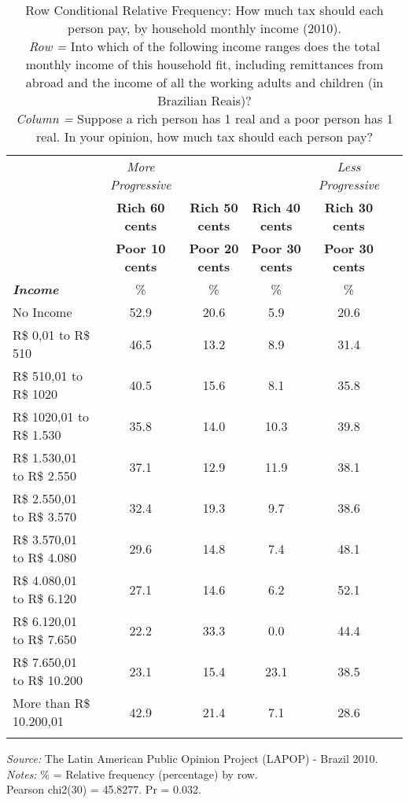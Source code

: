\documentclass[12pt,a4paper]{article}
\begin{document}
\begin{table}
\centering
\footnotesize
\caption[caption]{Row Conditional Relative Frequency: How much tax should each person pay, by household monthly income (2010). \\\hspace{\textwidth} \textit{Row =} Into which of the following income ranges does the total monthly income of this household fit, including remittances from abroad and the income of all the working adults and children (in Brazilian Reais)? \\\hspace{\textwidth} \textit{Column =} Suppose a rich person has 1 real and a poor person has 1 real. In your opinion, how much tax should each person pay?}
\begin{tabular}{l *{5}{c} }\\
\toprule

&\textit{More Progressive}&&&\textit{Less Progressive} \\

&\textbf{Rich 60 cents}&\textbf{Rich 50 cents}&\textbf{Rich 40 cents}&\textbf{Rich 30 cents} \\

&\textbf{Poor 10 cents}&\textbf{Poor 20 cents}&\textbf{Poor 30 cents}&\textbf{Poor 30 cents} \\

\cmidrule(l{.75em}){2-2} \cmidrule(l{.75em}){3-3}\cmidrule(l{.75em}){4-4}\cmidrule(l{.75em}){5-5}
\textbf{\textit{Income}}&\%&\%&\%&\% \\

\midrule
No Income&52.9&20.6&5.9&20.6 \\
R\$ 0,01 to R\$ 510 &46.5&13.2&8.9&31.4 \\
R\$ 510,01 to R\$ 1020 &40.5&15.6&8.1&35.8 \\
R\$ 1020,01 to R\$ 1.530 &35.8&14.0&10.3&39.8 \\
R\$ 1.530,01 to R\$ 2.550 &37.1&12.9&11.9&38.1 \\
R\$ 2.550,01 to R\$ 3.570 &32.4&19.3&9.7&38.6 \\
R\$ 3.570,01 to R\$ 4.080 &29.6&14.8&7.4&48.1 \\
R\$ 4.080,01 to R\$ 6.120 &27.1&14.6&6.2&52.1 \\
R\$ 6.120,01 to R\$ 7.650 &22.2&33.3&0.0&44.4 \\
R\$ 7.650,01 to R\$ 10.200 &23.1&15.4&23.1&38.5 \\
More than R\$ 10.200,01&42.9&21.4&7.1&28.6 \\
\bottomrule
\addlinespace[.75ex]
\end{tabular}
\par
\scriptsize{\emph{Source: }The Latin American Public Opinion Project (LAPOP) - Brazil 2010.}\\
\scriptsize{\emph{Notes:} \% = Relative frequency (percentage) by row.}\\
\scriptsize{Pearson chi2(30) =  45.8277. Pr = 0.032.}
\end{table}
\end{document}
